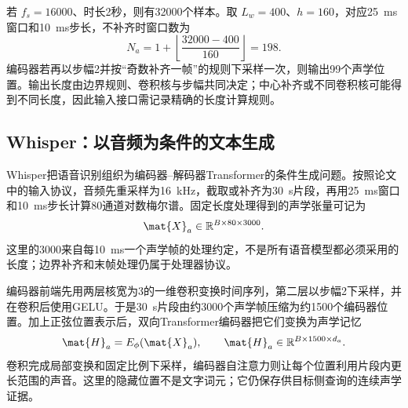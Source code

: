 \documentclass[../textbook.tex]{subfiles}
\begin{document}
若 $f_s=16000$、时长2秒，则有32000个样本。取 $L_w=400$、$h=160$，对应\SI{25}{\milli\second}窗口和\SI{10}{\milli\second}步长，不补齐时窗口数为
\begin{equation}
 N_a=1+\left\lfloor\frac{32000-400}{160}\right\rfloor=198.
\end{equation}
编码器若再以步幅2并按“奇数补齐一帧”的规则下采样一次，则输出99个声学位置。输出长度由边界规则、卷积核与步幅共同决定；中心补齐或不同卷积核可能得到不同长度，因此输入接口需记录精确的长度计算规则。

\subsection{Whisper：以音频为条件的文本生成}
Whisper把语音识别组织为编码器--解码器Transformer的条件生成问题\cite{radford2022whisper}。按照论文中的输入协议，音频先重采样为\SI{16}{\kilo\hertz}，截取或补齐为\SI{30}{\second}片段，再用\SI{25}{\milli\second}窗口和\SI{10}{\milli\second}步长计算80通道对数梅尔谱。固定长度处理得到的声学张量可记为
\begin{equation}
 \mat{X}_a\in\mathbb R^{B\times 80\times 3000}.
 \label{eq:mm-whisper-input}
\end{equation}
这里的3000来自每\SI{10}{\milli\second}一个声学帧的处理约定，不是所有语音模型都必须采用的长度；边界补齐和末帧处理仍属于处理器协议。

编码器前端先用两层核宽为3的一维卷积变换时间序列，第二层以步幅2下采样，并在卷积后使用GELU。于是\SI{30}{\second}片段由约3000个声学帧压缩为约1500个编码器位置。加上正弦位置表示后，双向Transformer编码器把它们变换为声学记忆
\begin{equation}
 \mat{H}_a=E_{\phi}(\mat{X}_a),\qquad
 \mat{H}_a\in\mathbb R^{B\times 1500\times d_a}.
 \label{eq:mm-whisper-encoder}
\end{equation}
卷积完成局部变换和固定比例下采样，编码器自注意力则让每个位置利用片段内更长范围的声音。这里的隐藏位置不是文字词元；它仍保存供目标侧查询的连续声学证据。
\end{document}
